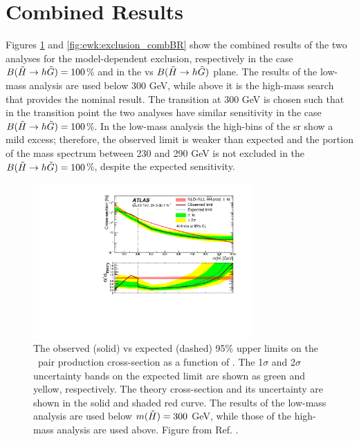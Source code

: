 \section{Combined Results}

Figures \ref{fig:ewk:exclusion_comb} and \ref{fig:ewk:exclusion_combBR} show the combined results of the two analyses for the model-dependent 
exclusion, respectively in the case $B(\tilde{H}\rightarrow h \tilde{G})=100$\% and in the \mhino vs $B(\tilde{H}\rightarrow h \tilde{G})$ plane.
The results of the low-mass analysis are used below 300 GeV, while above it is the high-mass search that provides the nominal result.
The transition at 300 GeV is chosen such that in the transition point the two analyses have 
similar sensitivity in the case $B(\tilde{H}\rightarrow h \tilde{G})=100$\%.
In the low-mass analysis the high-\met bins of the \gls{sr} show a mild excess; 
therefore, the observed limit is weaker than expected and the portion of the mass spectrum between 230 and 290 GeV is not excluded in the 
$B(\tilde{H}\rightarrow h \tilde{G})=100$\%, despite the expected sensitivity. 

\begin{figure}[htbp]
	\centering
\includegraphics[width=0.75\textwidth]{figures/ewk_prod/interpretation/GGMupperLimit_unblinded_jump}
	\caption{The observed (solid) vs expected (dashed) 95\% upper limits on the \hino\ pair production cross-section as a function of \mhino.  The 1$\sigma$ and 2$\sigma$ uncertainty bands on the expected limit are shown as green and yellow, respectively. The theory cross-section and its uncertainty are shown in the solid and shaded red curve.
   The results of the low-mass analysis are used below $m(\tilde{H}) = 300$ GeV, while those of the high-mass analysis are used above. 
   Figure from Ref. \cite{Aaboud:2018htj}. } 
	\label{fig:ewk:exclusion_comb}
\end{figure}


